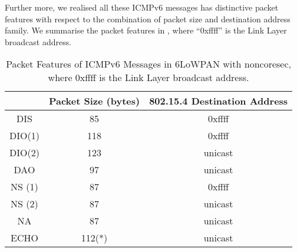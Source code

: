 Further more, we realised all these ICMPv6 messages has distinctive packet features with respect to the combination of packet size and destination address family. We summarise the packet features in , where ``0xffff'' is the Link Layer broadcast address.

\begin{table}[ht!]
	\center
	\begin{tabular}{|c|c|c|}
		\hline
		       & Packet Size (bytes) & 802.15.4 Destination Address \\ \hline
		DIS    & 85                  & 0xffff                       \\ \hline
		DIO(1) & 118                 & 0xffff                       \\ \hline
		DIO(2) & 123                 & unicast                      \\ \hline
		DAO    & 97                  & unicast                      \\ \hline
		NS (1) & 87                  & 0xffff                       \\ \hline
		NS (2) & 87                  & unicast                      \\ \hline
		NA     & 87                  & unicast                      \\ \hline
		ECHO   & 112(*)               & unicast                      \\ \hline
	\end{tabular}
	\caption{Packet Features of ICMPv6 Messages in 6LoWPAN with noncoresec, where 0xffff is the Link Layer broadcast address.}
	\label{Tbl: Packet Features of ICMPv6 Messages in 6LoWPAN with noncoresec}
\end{table}


